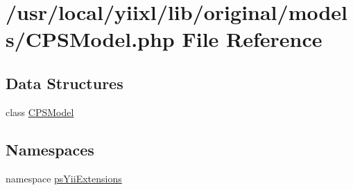 \hypertarget{CPSModel_8php}{
\section{/usr/local/yiixl/lib/original/models/CPSModel.php File Reference}
\label{CPSModel_8php}
}
\subsection*{Data Structures}
\begin{DoxyCompactItemize}
\item 
class \hyperlink{classCPSModel}{CPSModel}
\end{DoxyCompactItemize}
\subsection*{Namespaces}
\begin{DoxyCompactItemize}
\item 
namespace \hyperlink{namespacepsYiiExtensions}{psYiiExtensions}
\end{DoxyCompactItemize}
